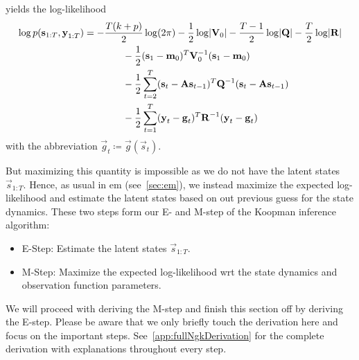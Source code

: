 	yields the log-likelihood
	\begin{align*}
		\log p(\boldsymbol{\mathrm{s}}_{1:T}, \boldsymbol{\mathrm{y}}_{1:T})
			&= -\frac{T(k + p)}{2} \log(2\pi) - \frac{1}{2} \log \lvert \boldsymbol{\mathrm{V}}_0 \rvert - \frac{T - 1}{2} \log \lvert \boldsymbol{\mathrm{Q}} \rvert - \frac{T}{2} \log \lvert \boldsymbol{\mathrm{R}} \rvert \\
			&\qquad\qquad -\frac{1}{2} (\boldsymbol{\mathrm{s}}_1 - \boldsymbol{\mathrm{m}}_0)^T \boldsymbol{\mathrm{V}}_0^{-1} (\boldsymbol{\mathrm{s}}_1 - \boldsymbol{\mathrm{m}}_0) \\
			&\qquad\qquad -\frac{1}{2} \sum_{t = 2}^{T} (\boldsymbol{\mathrm{s}}_t - \boldsymbol{\mathrm{A}} \boldsymbol{\mathrm{s}}_{t - 1})^T \boldsymbol{\mathrm{Q}}^{-1} (\boldsymbol{\mathrm{s}}_t - \boldsymbol{\mathrm{A}} \boldsymbol{\mathrm{s}}_{t - 1}) \\
			&\qquad\qquad -\frac{1}{2} \sum_{t = 1}^{T} (\boldsymbol{\mathrm{y}}_t - \boldsymbol{\mathrm{g}}_t)^T \boldsymbol{\mathrm{R}}^{-1} (\boldsymbol{\mathrm{y}}_t - \boldsymbol{\mathrm{g}}_t)
	\end{align*}
	with the abbreviation \( \vec{g}_t \coloneqq \vec{g}(\vec{s}_t) \).

	But maximizing this quantity is impossible as we do not have the latent states \( \vec{s}_{1:T} \). Hence, as usual in \ac{em} (see~\autoref{sec:em}), we instead maximize the expected log-likelihood and estimate the latent states based on out previous guess for the state dynamics. These two steps form our E- and M-step of the Koopman inference algorithm:
	\begin{itemize}
		\item E-Step: Estimate the latent states \( \vec{s}_{1:T} \).
		\item M-Step: Maximize the expected log-likelihood \ac{wrt} the state dynamics and observation function parameters.
	\end{itemize}
	We will proceed with deriving the M-step and finish this section off by deriving the E-step. Please be aware that we only briefly touch the derivation here and focus on the important steps. See~\autoref{app:fullNgkDerivation} for the complete derivation with explanations throughout every step.

